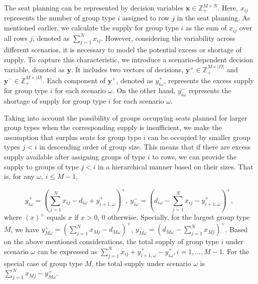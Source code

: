 The seat planning can be represented by decision variables $\mathbf{x} \in \mathbb{Z}_{+}^{M \times N}$. Here, $x_{ij}$ represents the number of group type $i$ assigned to row $j$ in the seat planning. As mentioned earlier, we calculate the supply for group type $i$ as the sum of $x_{ij}$ over all rows $j$, denoted as $\sum_{j=1}^N x_{ij}$. However, considering the variability across different scenarios, it is necessary to model the potential excess or shortage of supply. To capture this characteristic, we introduce a scenario-dependent decision variable, denoted as $\mathbf{y}$. 
It includes two vectors of decisions, $\mathbf{y}^{+} \in \mathbb{Z}_{+}^{M \times |\Omega|}$ and $\mathbf{y}^{-} \in \mathbb{Z}_{+}^{M \times |\Omega|}$. Each component of $\mathbf{y}^{+}$, denoted as $y_{i\omega}^{+}$, represents the excess supply for group type $i$ for each scenario $\omega$. On the other hand, $y_{i\omega}^{-}$ represents the shortage of supply for group type $i$ for each scenario $\omega$.

Taking into account the possibility of groups occupying seats planned for larger group types when the corresponding supply is insufficient, we make the assumption that surplus seats for group type $i$ can be occupied by smaller group types $j<i$ in descending order of group size. This means that if there are excess supply available after assigning groups of type $i$ to rows, we can provide the supply to groups of type $j<i$ in a hierarchical manner based on their sizes. That is, for any $\omega$, $i \leq M-1$, 

$$y_{i \omega}^{+}=\left(\sum_{j=1}^N x_{ij}- d_{i \omega} + y_{i+1, \omega}^{+}\right)^{+}, ~y_{i \omega}^{-}=\left(d_{i \omega}- \sum_{j=1}^N x_{ij} - y_{i+1, \omega}^{+} \right)^{+},$$
where $(x)^{+}$ equals $x$ if $x>0$, $0$ otherwise. Specially, for the largest group type $M$, we have $y_{M \omega}^{+} = (\sum_{j=1}^N x_{Mj} - d_{M \omega})^{+}$, $y_{M \omega}^{-} = (d_{M \omega}- \sum_{j=1}^N x_{Mj})^{+}$. Based on the above mentioned considerations, the total supply of group type $i$ under scenario $\omega$ can be expressed as $\sum_{j= 1}^{N} x_{ij} + y_{i+1,\omega}^{+} - y_{i \omega}^{+}, i = 1, \ldots, M-1$. For the special case of group type $M$, the total supply under scenario $\omega$ is $\sum_{j= 1}^{N} x_{Mj} - y_{M \omega}^{+}$.


